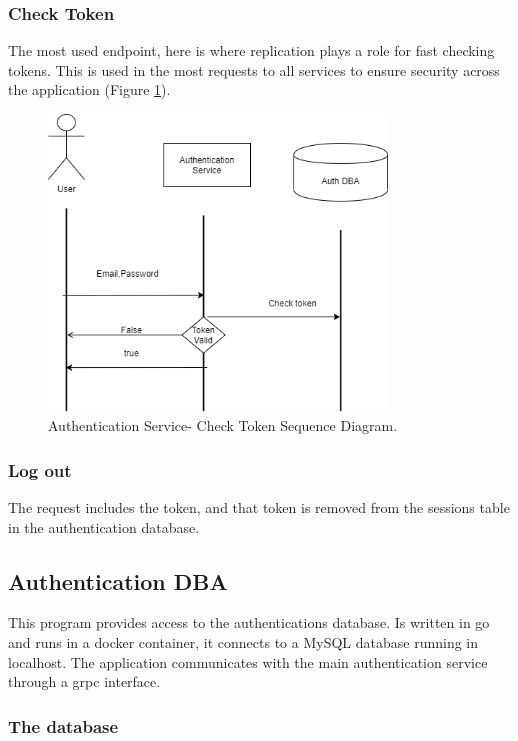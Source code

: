 \subsubsection{Check Token}

\indent
\indent
The most used endpoint, here is where replication plays a role for fast checking tokens. This is used in the most requests to all services to ensure security across the application (Figure \ref{auth:checktokensequence}).


\begin{figure}
\begin{center}
\includegraphics[width=90mm,scale=1]{img/auth/check-token-sequence.png}
\caption{Authentication Service- Check Token Sequence Diagram.}
\label{auth:checktokensequence}
\end{center}
\end{figure}

\subsubsection{Log out}
\indent
\indent
The request includes the token, and that token is removed from the sessions table in the authentication database.


\subsection{Authentication DBA}
\indent
\indent
This program provides access to the authentications database. Is written in go and runs in a docker container, it connects to a MySQL database running in localhost. The application communicates with the main authentication service through a grpc interface.

\subsubsection{The database}


